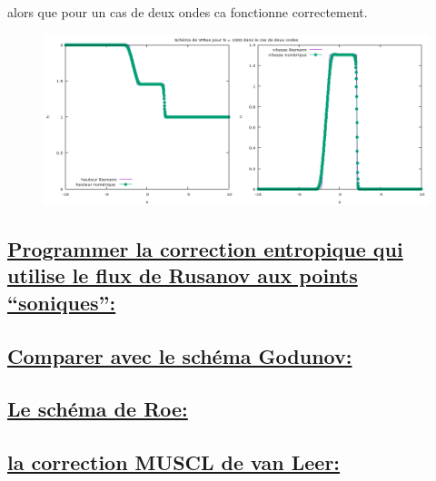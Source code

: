 alors que pour un cas de deux ondes ca fonctionne correctement.

\begin{figure}[h!]
	\centering \includegraphics[scale=0.5]{Images_Fichiers/vfroe2.png}

\end{figure}

\subsection[Programmer la correction entropique qui utilise le flux de Rusanov aux points “soniques”]{\uline{Programmer la correction entropique qui utilise le flux de Rusanov aux points “soniques”:}}

\subsection[Comparer avec le sch\'ema Godunov]{\uline{Comparer avec le sch\'ema Godunov:}}

\subsection[Le sch\'ema de Roe]{\uline{Le sch\'ema de Roe:}}

\subsection[La correction MUSCL de van Leer]{\uline{la correction MUSCL de van Leer:}}



